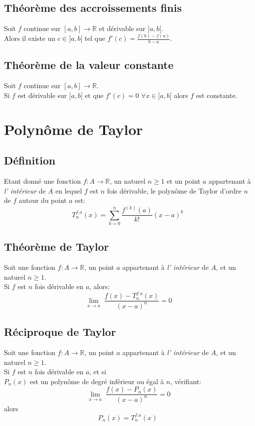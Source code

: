 \subsection{Théorème des accroissements finis}
Soit $f$ continue sur $ [a,b] \rightarrow \mathbb{R}$ et dérivable sur $]a,b[$.\\
Alors il existe un $c \in ]a,b[$ tel que $f'(c) = \frac{f(b) - f(a)}{b - a}$.

\subsection{Théorème de la valeur constante}
Soit $f$ continue sur $ [a,b] \rightarrow \mathbb{R}$.\\
Si $f$ est dérivable sur $]a,b[$ et que $f'(c) = 0$ $\forall x \in ]a,b[$ alors $f$ est constante.

\section{Polynôme de Taylor}
\subsection{Définition}
Etant donné une fonction $f : A \rightarrow \mathbb{R}$, un naturel $n \geq 1$ et un point $a$ appartenant à \emph{l' intérieur} de $A$ en lequel $f$ est $n$ fois dérivable, le polynôme de Taylor d'ordre $n$ de $f$ autour du point $a$ est:
\[T_n^{f.a}(x) = \sum_{k = 0}^n \frac{f^{(k)}(a)}{k!}(x - a)^k\]

\subsection{Théorème de Taylor}
Soit une fonction $f : A \rightarrow \mathbb{R}$, un point $a$ appartenant à \emph{l' intérieur} de $A$, et un naturel $n \geq 1$.\\
Si $f$ est $n$ fois dérivable en $a$, alors:
\[\lim_{\substack{x \rightarrow a}} \frac{f(x) - T_n^{f.a}(x)}{(x - a)^n} = 0\]

\subsection{Réciproque de Taylor}
Soit une fonction $f : A \rightarrow \mathbb{R}$, un point $a$ appartenant à \emph{l' intérieur} de $A$, et un naturel $n \geq 1$.\\
Si $f$ est $n$ fois dérivable en $a$, et si \\
$P_n(x)$ est un polynôme de degré inférieur ou égal à $n$, vérifiant: \[\lim_{\substack{x \rightarrow a}} \frac{f(x) - P_n(x)}{(x - a)^n} = 0\]
 alors \[P_n(x) = T_n^{f.a}(x)\]
